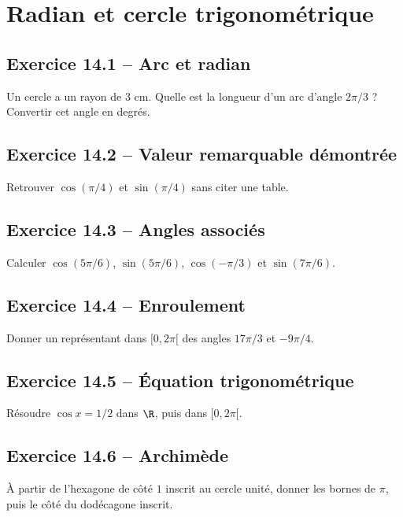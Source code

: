 \chapter{Radian et cercle trigonométrique}
\section*{Exercice 14.1 -- Arc et radian}
Un cercle a un rayon de $3$ cm. Quelle est la longueur d'un arc d'angle $2\pi/3$ ? Convertir cet angle en degrés.

\section*{Exercice 14.2 -- Valeur remarquable démontrée}
Retrouver $\cos(\pi/4)$ et $\sin(\pi/4)$ sans citer une table.

\section*{Exercice 14.3 -- Angles associés}
Calculer $\cos(5\pi/6)$, $\sin(5\pi/6)$, $\cos(-\pi/3)$ et $\sin(7\pi/6)$.

\section*{Exercice 14.4 -- Enroulement}
Donner un représentant dans $[0,2\pi[$ des angles $17\pi/3$ et $-9\pi/4$.

\section*{Exercice 14.5 -- Équation trigonométrique}
Résoudre $\cos x=1/2$ dans $\R$, puis dans $[0,2\pi[$.

\section*{Exercice 14.6 -- Archimède}
À partir de l'hexagone de côté $1$ inscrit au cercle unité, donner les bornes de $\pi$, puis le côté du dodécagone inscrit.
